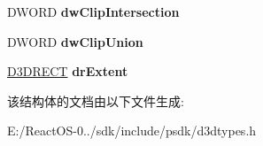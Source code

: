 \begin{DoxyCompactItemize}
\item 
\mbox{\label{struct___d3_d_t_r_a_n_s_f_o_r_m_d_a_t_a_a67799fcca91d4392870c7247802a883e}} 
D\+W\+O\+RD {\bfseries dw\+Clip\+Intersection}
\item 
\mbox{\label{struct___d3_d_t_r_a_n_s_f_o_r_m_d_a_t_a_ae2f95fa8845d150485b1441faa1facd5}} 
D\+W\+O\+RD {\bfseries dw\+Clip\+Union}
\item 
\mbox{\label{struct___d3_d_t_r_a_n_s_f_o_r_m_d_a_t_a_ab59e3c5158f99c1b1086e7dd86c4e813}} 
\hyperlink{struct___d3_d_r_e_c_t}{D3\+D\+R\+E\+CT} {\bfseries dr\+Extent}
\end{DoxyCompactItemize}


该结构体的文档由以下文件生成\+:\begin{DoxyCompactItemize}
\item 
E\+:/\+React\+O\+S-\/0../sdk/include/psdk/d3dtypes.\+h\end{DoxyCompactItemize}
